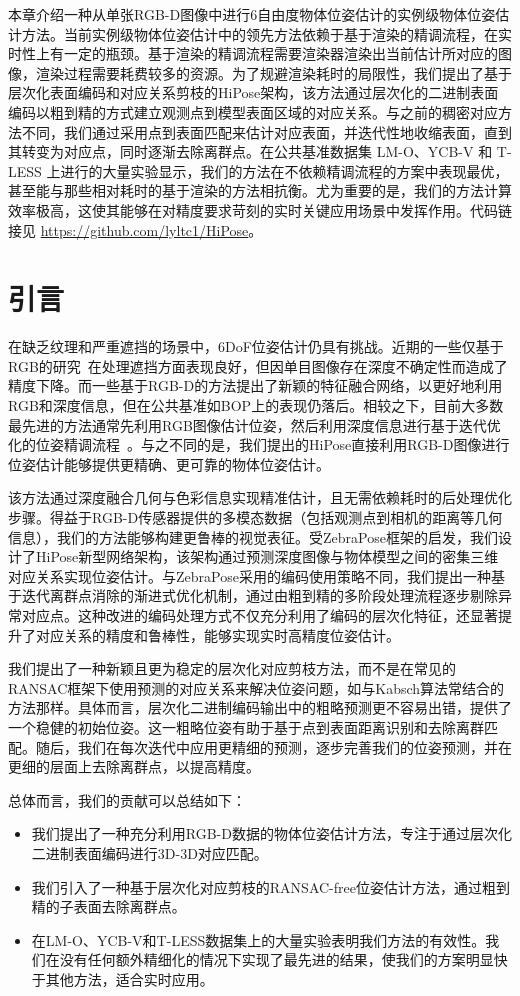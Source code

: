 本章介绍一种从单张RGB-D图像中进行6自由度物体位姿估计的实例级物体位姿估计方法。当前实例级物体位姿估计中的领先方法\cite{Sundermeyer2023BOPC2}依赖于基于渲染的精调流程，在实时性上有一定的瓶颈。基于渲染的精调流程需要渲染器渲染出当前估计所对应的图像，渲染过程需要耗费较多的资源。为了规避渲染耗时的局限性，我们提出了基于层次化表面编码和对应关系剪枝的HiPose架构，该方法通过层次化的二进制表面编码以粗到精的方式建立观测点到模型表面区域的对应关系。与之前的稠密对应方法不同，我们通过采用点到表面匹配来估计对应表面，并迭代性地收缩表面，直到其转变为对应点，同时逐渐去除离群点。在公共基准数据集 LM-O、YCB-V 和 T-LESS 上进行的大量实验显示，我们的方法在不依赖精调流程的方案中表现最优，甚至能与那些相对耗时的基于渲染的方法相抗衡。尤为重要的是，我们的方法计算效率极高，这使其能够在对精度要求苛刻的实时关键应用场景中发挥作用。代码链接见 \url{https://github.com/lyltc1/HiPose}。

\section{引言}
在缺乏纹理和严重遮挡的场景中，6DoF位姿估计仍具有挑战。近期的一些仅基于RGB的研究~\cite{zakharov2019dpod,park2019pix2pose,su2022zebrapose}在处理遮挡方面表现良好，但因单目图像存在深度不确定性而造成了精度下降。而一些基于RGB-D的方法\cite{wang2019densefusion, he2020pvn3d,he2021ffb6d,zhou2023deep}提出了新颖的特征融合网络，以更好地利用RGB和深度信息，但在公共基准如BOP\cite{Sundermeyer2023BOPC2}上的表现仍落后。相较之下，目前大多数最先进的方法通常先利用RGB图像估计位姿，然后利用深度信息进行基于迭代优化的位姿精调流程~\cite{Rusinkiewicz2001EfficientVO,lipson2022coupled}。与之不同的是，我们提出的HiPose直接利用RGB-D图像进行位姿估计能够提供更精确、更可靠的物体位姿估计。

该方法通过深度融合几何与色彩信息实现精准估计，且无需依赖耗时的后处理优化步骤。得益于RGB-D传感器提供的多模态数据（包括观测点到相机的距离等几何信息），我们的方法能够构建更鲁棒的视觉表征。受ZebraPose\cite{su2022zebrapose}框架的启发，我们设计了HiPose新型网络架构，该架构通过预测深度图像与物体模型之间的密集三维对应关系实现位姿估计。与ZebraPose采用的编码使用策略不同，我们提出一种基于迭代离群点消除的渐进式优化机制，通过由粗到精的多阶段处理流程逐步剔除异常对应点。这种改进的编码处理方式不仅充分利用了编码的层次化特征，还显著提升了对应关系的精度和鲁棒性，能够实现实时高精度位姿估计。

我们提出了一种新颖且更为稳定的层次化对应剪枝方法，而不是在常见的RANSAC框架下使用预测的对应关系来解决位姿问题，如与Kabsch算法\cite{umeyama1991least}常结合的方法那样。具体而言，层次化二进制编码输出中的粗略预测更不容易出错，提供了一个稳健的初始位姿。这一粗略位姿有助于基于点到表面距离识别和去除离群匹配。随后，我们在每次迭代中应用更精细的预测，逐步完善我们的位姿预测，并在更细的层面上去除离群点，以提高精度。

总体而言，我们的贡献可以总结如下：
\begin{itemize}
\item 我们提出了一种充分利用RGB-D数据的物体位姿估计方法，专注于通过层次化二进制表面编码进行3D-3D对应匹配。
\item 我们引入了一种基于层次化对应剪枝的RANSAC-free位姿估计方法，通过粗到精的子表面去除离群点。
\item 在LM-O、YCB-V和T-LESS数据集上的大量实验表明我们方法的有效性。我们在没有任何额外精细化的情况下实现了最先进的结果，使我们的方案明显快于其他方法，适合实时应用。
\end{itemize}
